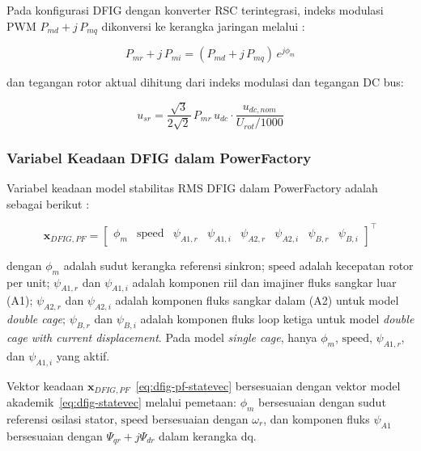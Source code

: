 Pada konfigurasi DFIG dengan konverter RSC terintegrasi, indeks modulasi PWM
$P_{md} + j\,P_{mq}$ dikonversi ke kerangka jaringan melalui \cite{digsilent2024doubly}:

\begin{equation}
  P_{mr} + j\,P_{mi} = (P_{md} + j\,P_{mq})\,e^{j\phi_m}
  \label{eq:dfig-pwm}
\end{equation}

dan tegangan rotor aktual dihitung dari indeks modulasi dan tegangan DC bus:

\begin{equation}
  u_{sr} = \frac{\sqrt{3}}{2\sqrt{2}}\,P_{mr}\,u_{dc}
    \cdot \frac{u_{dc,nom}}{U_{rot}/1000}
  \label{eq:dfig-usr}
\end{equation}

\subsubsection{Variabel Keadaan DFIG dalam PowerFactory}

Variabel keadaan model stabilitas RMS DFIG dalam PowerFactory adalah sebagai berikut
\cite{digsilent2024doubly}:

\begin{equation}
  \mathbf{x}_{DFIG,PF} =
  \begin{bmatrix}\phi_m & \mathrm{speed} &
    \psi_{A1,r} & \psi_{A1,i} &
    \psi_{A2,r} & \psi_{A2,i} &
    \psi_{B,r}  & \psi_{B,i}
  \end{bmatrix}^\top
  \label{eq:dfig-pf-statevec}
\end{equation}

dengan $\phi_m$ adalah sudut kerangka referensi sinkron; $\mathrm{speed}$ adalah
kecepatan rotor per unit; $\psi_{A1,r}$ dan $\psi_{A1,i}$ adalah komponen riil dan
imajiner fluks sangkar luar (A1); $\psi_{A2,r}$ dan $\psi_{A2,i}$ adalah komponen
fluks sangkar dalam (A2) untuk model \textit{double cage}; $\psi_{B,r}$ dan $\psi_{B,i}$
adalah komponen fluks loop ketiga untuk model \textit{double cage with current
displacement}. Pada model \textit{single cage}, hanya $\phi_m$, $\mathrm{speed}$,
$\psi_{A1,r}$, dan $\psi_{A1,i}$ yang aktif.

Vektor keadaan $\mathbf{x}_{DFIG,PF}$~\eqref{eq:dfig-pf-statevec} bersesuaian
dengan vektor model akademik~\eqref{eq:dfig-statevec} melalui pemetaan:
$\phi_m$ bersesuaian dengan sudut referensi osilasi stator, $\mathrm{speed}$
bersesuaian dengan $\omega_r$, dan komponen fluks $\psi_{A1}$ bersesuaian dengan
$\Psi_{qr} + j\Psi_{dr}$ dalam kerangka dq.

